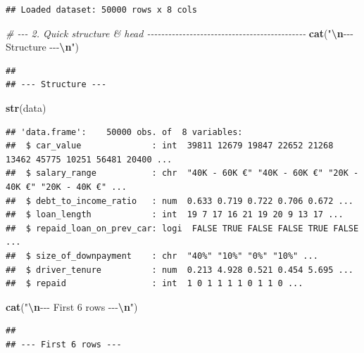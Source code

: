 \documentclass[
]{article}
\newenvironment{Shaded}{\begin{snugshade}}{\end{snugshade}}
\newcommand{\CommentTok}[1]{\textcolor[rgb]{0.56,0.35,0.01}{\textit{#1}}}
\newcommand{\FunctionTok}[1]{\textcolor[rgb]{0.13,0.29,0.53}{\textbf{#1}}}
\newcommand{\NormalTok}[1]{#1}
\newcommand{\SpecialCharTok}[1]{\textcolor[rgb]{0.81,0.36,0.00}{\textbf{#1}}}
\newcommand{\StringTok}[1]{\textcolor[rgb]{0.31,0.60,0.02}{#1}}
\begin{document}
\begin{verbatim}
## Loaded dataset: 50000 rows x 8 cols
\end{verbatim}

\begin{Shaded}
\begin{Highlighting}[]
\CommentTok{\# {-}{-}{-} 2. Quick structure \& head {-}{-}{-}{-}{-}{-}{-}{-}{-}{-}{-}{-}{-}{-}{-}{-}{-}{-}{-}{-}{-}{-}{-}{-}{-}{-}{-}{-}{-}{-}{-}{-}{-}{-}{-}{-}{-}{-}{-}{-}{-}{-}{-}{-}{-}}
\FunctionTok{cat}\NormalTok{(}\StringTok{"}\SpecialCharTok{\textbackslash{}n}\StringTok{{-}{-}{-} Structure {-}{-}{-}}\SpecialCharTok{\textbackslash{}n}\StringTok{"}\NormalTok{)}
\end{Highlighting}
\end{Shaded}

\begin{verbatim}
## 
## --- Structure ---
\end{verbatim}

\begin{Shaded}
\begin{Highlighting}[]
\FunctionTok{str}\NormalTok{(data)}
\end{Highlighting}
\end{Shaded}

\begin{verbatim}
## 'data.frame':    50000 obs. of  8 variables:
##  $ car_value              : int  39811 12679 19847 22652 21268 13462 45775 10251 56481 20400 ...
##  $ salary_range           : chr  "40K - 60K €" "40K - 60K €" "20K - 40K €" "20K - 40K €" ...
##  $ debt_to_income_ratio   : num  0.633 0.719 0.722 0.706 0.672 ...
##  $ loan_length            : int  19 7 17 16 21 19 20 9 13 17 ...
##  $ repaid_loan_on_prev_car: logi  FALSE TRUE FALSE FALSE TRUE FALSE ...
##  $ size_of_downpayment    : chr  "40%" "10%" "0%" "10%" ...
##  $ driver_tenure          : num  0.213 4.928 0.521 0.454 5.695 ...
##  $ repaid                 : int  1 0 1 1 1 1 0 1 1 0 ...
\end{verbatim}

\begin{Shaded}
\begin{Highlighting}[]
\FunctionTok{cat}\NormalTok{(}\StringTok{"}\SpecialCharTok{\textbackslash{}n}\StringTok{{-}{-}{-} First 6 rows {-}{-}{-}}\SpecialCharTok{\textbackslash{}n}\StringTok{"}\NormalTok{)}
\end{Highlighting}
\end{Shaded}

\begin{verbatim}
## 
## --- First 6 rows ---
\end{verbatim}
\end{document}
